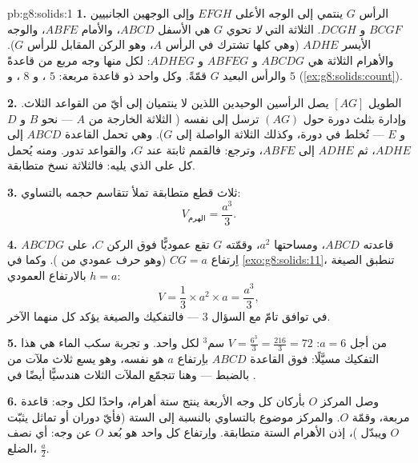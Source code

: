 \begin{solution}{pb:g8:solids:1}
\textbf{1.} الرأس $G$ ينتمي إلى الوجه الأعلى $EFGH$ وإلى الوجهين
الجانبيين $BCGF$ و $DCGH$.  الثلاثة التي \emph{لا}
تحوي $G$ هي الأسفل $ABCD$، والأمام $ABFE$، والوجه
الأيسر $ADHE$ (وهي كلها تشترك في الرأس $A$، وهو الركن
المقابل للرأس $G$). والأهرام الثلاثة هي $ABCDG$ و $ABFEG$ و
$ADHEG$: لكل منها وجه مربع من  قاعدةً والرأس
البعيد $G$ قمّةً. وكل واحد  ذو قاعدة مربعة: $5$ ،
و $8$ ، و $5$  (\cref{ex:g8:solids:count}).

\textbf{2.}  الطويل $[AG]$ يصل الرأسين الوحيدين
اللذين لا ينتميان إلى أيّ من القواعد الثلاث. وإدارة بثلث دورة
حول  $(AG)$ ترسل  إلى نفسه ( الثلاثة
الخارجة من $A$ --- نحو $B$ و $D$ و $E$ --- تُخلط في
دورة، وكذلك  الثلاثة الواصلة إلى $G$). وهي تحمل
القاعدة $ABCD$ إلى $ADHE$، ثم $ADHE$ إلى $ABFE$، وترجع:
فالقمم ثابتة عند $G$، والقواعد تدور. ومنه يُحمل كل 
على الذي يليه: فالثلاثة نسخ متطابقة.

\textbf{3.} ثلاث قطع متطابقة تملأ  تتقاسم
حجمه بالتساوي:
\[
V_{\text{الهرم}} = \frac{a^3}{3} .
\]

\textbf{4.}  $ABCDG$ قاعدته $ABCD$، ومساحتها $a^2$،
وقمّته $G$ تقع عموديًّا فوق الركن $C$، على اِرتفاع
$CG = a$ (وهو حرف عمودي من ). وكما في
\cref{exo:g8:solids:11}، تنطبق الصيغة بالارتفاع
العمودي $h = a$:
\[
V = \frac13 \times a^2 \times a = \frac{a^3}{3} ,
\]
في توافق تامّ مع السؤال 3 --- فالتفكيك
والصيغة يؤكد كل منهما الآخر.

\textbf{5.} من أجل $a = 6$:
$V = \frac{6^3}{3} = \frac{216}{3} = 72$ سم$^3$ لكل واحد. و
تجربة سكب الماء هي هذا التفكيك مسيَّلًا:
 فوق القاعدة $ABCD$ باِرتفاع $a$ هو  نفسه،
وهو يسع ثلاث ملآت من  بالضبط --- وهنا تتجمّع الملآت
الثلاث هندسيًّا أيضًا في .

\textbf{6.} وصل المركز $O$ بأركان كل وجه
الأربعة ينتج ستة أهرام، واحدًا لكل وجه: قاعدة مربعة، وقمّة $O$.
والمركز موضوع بالتساوي بالنسبة إلى  الستة (فأيّ
دوران أو تماثل  يثبّت $O$ ويبدّل
)، إذن الأهرام الستة متطابقة. واِرتفاع كل واحد هو
بُعد $O$ عن وجه: أي نصف الضلع، $\frac{a}{2}$.


\end{solution}
